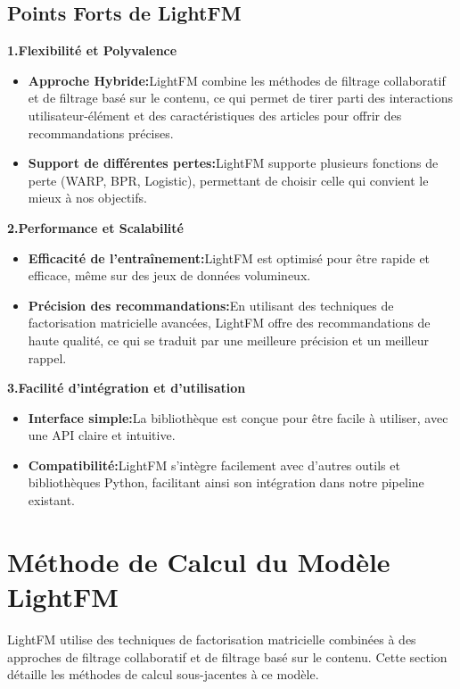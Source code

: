 \documentclass[edit,12pt,a4paper,ChapStyle,oneside,doubleinterligne]{report}
\begin{document}
\subsection*{Points Forts de LightFM}
\textbf{1.Flexibilité et Polyvalence}
\begin{itemize}
    \item \textbf{Approche Hybride:}LightFM combine les méthodes de filtrage collaboratif et de filtrage basé sur le contenu, ce qui permet de tirer parti des interactions utilisateur-élément et des caractéristiques des articles pour offrir des recommandations précises.
    \item \textbf{Support de différentes pertes:}LightFM supporte plusieurs fonctions de perte (WARP, BPR, Logistic), permettant de choisir celle qui convient le mieux à nos objectifs.
\end{itemize}
\phantom{2.2}\textbf{2.Performance et Scalabilité}
\begin{itemize}
    \item \textbf{Efficacité de l'entraînement:}LightFM est optimisé pour être rapide et efficace, même sur des jeux de données volumineux.
    \item \textbf{Précision des recommandations:}En utilisant des techniques de factorisation matricielle avancées, LightFM offre des recommandations de haute qualité, ce qui se traduit par une meilleure précision et un meilleur rappel.
\end{itemize}
\phantom{2.2}\textbf{3.Facilité d'intégration et d'utilisation}
\begin{itemize}
    \item \textbf{Interface simple:}La bibliothèque est conçue pour être facile à utiliser, avec une API claire et intuitive.
    \item \textbf{Compatibilité:}LightFM s'intègre facilement avec d'autres outils et bibliothèques Python, facilitant ainsi son intégration dans notre pipeline existant.
\end{itemize}

\section{Méthode de Calcul du Modèle LightFM}
LightFM utilise des techniques de factorisation matricielle combinées à des approches de filtrage collaboratif et de filtrage basé sur le contenu. Cette section détaille les méthodes de calcul sous-jacentes à ce modèle.
\end{document}
